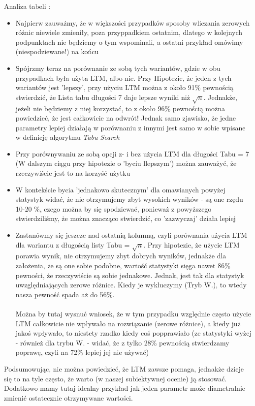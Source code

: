 \documentclass{article}
\begin{document}
Analiza tabeli :
\begin{itemize}
	\item Najpierw zauważmy, że w większości przypadków sposoby wliczania zerowych różnic niewiele zmieniły, poza przyppadkiem ostatnim, dlatego w kolejnych podpunktach nie będziemy o tym wspominali, a ostatni przykład omówimy (niespodziewane!) na końcu 
	\item Spójrzmy teraz na porównanie ze sobą tych wariantów, gdzie w obu przypadkach była użyta LTM, albo nie. Przy Hipotezie, że jeden z tych wariantów jest 'lepszy', przy użyciu LTM można z około 91\% pewnością stwierdzić, że Lista tabu długości 7 daje lepsze wyniki niż $\sqrt{n}$. Jednakże, jeżeli nie będziemy z niej korzystać, to z około 96\% pewnością można powiedzieć, że jest całkowicie na odwrót! Jednak samo zjawisko, że jedne parametry lepiej działają w porównaniu z innymi jest samo w sobie wpisane w definicję algorytmu \textit{Tabu Search}
	\item Przy porównywaniu ze sobą opcji z- i bez użycia LTM dla długości Tabu = 7 (W dalszym ciągu przy hipotezie o 'byciu llepszym') można zauważyć, że rzeczywiście jest to na korzyść użytku
	\item W kontekście bycia 'jednakowo skutecznym' dla omawianych powyżej statystyk widać, że nie otrzymujemy zbyt wysokich wyników - są one rzędu 10-20 \%, czego można by się spodziewać, ponieważ z powyższego stwierdziliśmy, że można znacząco stwierdzić, co 'zazwyczaj' działa lepiej
	\item Zastanówmy się jeszcze nad ostatnią kolumną, czyli porównania użycia LTM dla wariantu z długością listy Tabu = $\sqrt{n}$. Przy hipotezie, że użycie LTM porawia wynik, nie otrzymujemy zbyt dobrych wyników, jednakże dla założenia, że są one sobie podobne, wartość statystyki sięga nawet 86\% pewności, że rzeczywiście są sobie jednakowe. Jednak, jest tak dla statystyk uwzględniających zerowe różnice. Kiedy je wykluczymy (Tryb W.), to wtedy nasza pewność spada aż do 56\%.\\\\
	Można by tutaj wysnuć wniosek, że w tym przypadku względnie często użycie LTM całkowicie nie wpływało na rozwiązanie (zerowe różnice), a kiedy już jakoś wpływało, to niestety rzadko kiedy coś popprawiało (ze statystyki wyżej - również dla trybu W. - widać, że z tylko 28\% pewnością stwierdzamy poprawę, czyli na 72\% lepiej jej nie używać)
\end{itemize}

Podsumowując, nie można powiedzieć, że LTM zawsze pomaga, jednakże dzieje się to na tyle często, że warto (w naszej subiektywnej ocenie) ją stosować. Dodatkowo mamy tutaj idealny przykład jak jeden parametr może diametralnie zmienić ostatecznie otrzymywane wartości.
\end{document}
